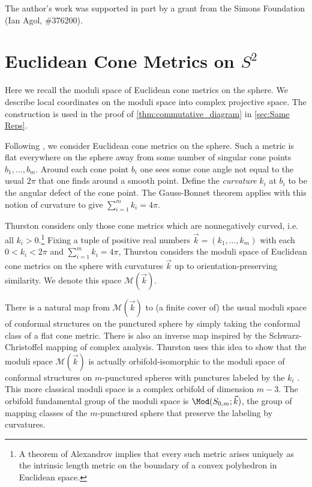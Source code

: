 \documentclass{amsart}
\begin{document}
    The author's work was supported in part by a grant from the Simons Foundation (Ian Agol, \#376200).
    
\section{Euclidean Cone Metrics on \texorpdfstring{$S^2$}{the Sphere}}\label{sec:Cone metrics}
    Here we recall the moduli space of Euclidean cone metrics on the sphere. We describe local coordinates on the moduli space into complex projective space. The construction is used in the proof of \cref{thm:commutative_diagram} in \cref{sec:Same Reps}.

    Following \cite{Thurston1998ShapesSphere}, we consider Euclidean cone metrics on the sphere. Such a metric is flat everywhere on the sphere away from some number of singular cone points $b_1,\dotsc,b_m$. Around each cone point $b_i$ one sees some cone angle not equal to the usual $2\pi$ that one finds around a smooth point. Define the \emph{curvature} $k_i$ at $b_i$ to be the angular defect of the cone point. The Gauss-Bonnet theorem applies with this notion of curvature to give $\sum_{i=1}^m k_i = 4\pi$.
    
    Thurston considers only those cone metrics which are nonnegatively curved, i.e. all $k_i > 0$.\footnote{A theorem of Alexandrov implies that every such metric arises uniquely as the intrinsic length metric on the boundary of a convex polyhedron in Euclidean space.} Fixing a tuple of positive real numbers $\vec k=(k_1,\dotsc,k_m)$ with each $0<k_i<2\pi$ and $\sum_{i=1}^m k_i=4\pi$, Thurston considers the moduli space of Euclidean cone metrics on the sphere with curvatures $\vec k$ up to orientation-preserving similarity. We denote this space $\mathcal{M}(\vec k)$.
    
    
    There is a natural map from $\mathcal{M}(\vec k)$ to (a finite cover of) the usual moduli space of conformal structures on the punctured sphere by simply taking the conformal class of a flat cone metric. There is also an inverse map inspired by the Schwarz-Christoffel mapping of complex analysis. Thurston uses this idea to show that the moduli space $\mathcal{M}(\vec k)$ is actually orbifold-isomorphic to the moduli space of conformal structures on $m$-punctured spheres with punctures labeled by the $k_i$ \cite[Proposition 8.1]{Thurston1998ShapesSphere}. This more classical moduli space is a complex orbifold of dimension $m-3$. The orbifold fundamental group of the moduli space is $\Mod(S_{0,m};\vec k)$, the group of mapping classes of the $m$-punctured sphere that preserve the labeling by curvatures.
    
\end{document}
